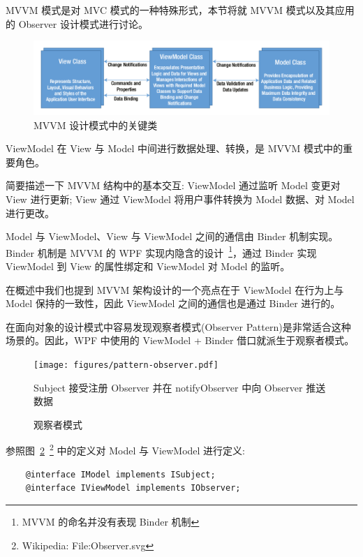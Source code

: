 MVVM 模式是对 MVC 模式的一种特殊形式，本节将就 MVVM 模式以及其应用的 Observer 设计模式进行讨论。

\begin{figure}[!h]
  \begin{center}
    \includegraphics[scale=0.5]{figures/diagram-mvvm-pattern-ref.png}
    \caption{MVVM 设计模式中的关键类~\cite{ghoda2012windows}\label{MVVMCoreClasses}}
  \end{center}
\end{figure}

ViewModel 在 View 与 Model 中间进行数据处理、转换，是 MVVM 模式中的重要角色。

简要描述一下 MVVM 结构中的基本交互: ViewModel 通过监听 Model 变更对 View 进行更新; View 通过 ViewModel 将用户事件转换为 Model 数据、对 Model 进行更改。

Model 与 ViewModel、View 与 ViewModel 之间的通信由 Binder 机制实现。Binder 机制是 MVVM 的 WPF 实现内隐含的设计~\footnote{MVVM 的命名并没有表现 Binder 机制}，通过 Binder 实现 ViewModel 到 View 的属性绑定和 ViewModel 对 Model 的监听。

在概述中我们也提到 MVVM 架构设计的一个亮点在于 ViewModel 在行为上与 Model 保持的一致性，因此 ViewModel 之间的通信也是通过 Binder 进行的。

在面向对象的设计模式中容易发现观察者模式(Observer Pattern)是非常适合这种场景的。因此，WPF 中使用的 ViewModel + Binder 借口就派生于观察者模式。

\begin{figure}[!h]
  \begin{center}
    \texttt{[image: figures/pattern-observer.pdf]}
    \caption{观察者模式\label{PatternObserver}}
    Subject 接受注册 Observer 并在 notifyObserver 中向 Observer 推送数据
  \end{center}
\end{figure}

参照图~\ref{PatternObserver}~\footnote{Wikipedia: File:Observer.svg} 中的定义对 Model 与 ViewModel 进行定义:

\begin{verbatim}
    @interface IModel implements ISubject;
    @interface IViewModel implements IObserver;
\end{verbatim}

